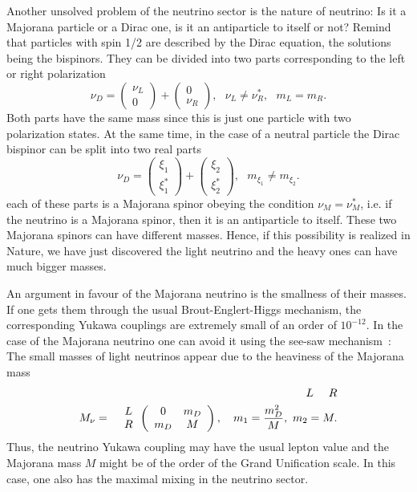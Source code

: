 \documentclass{cernyrep}
\begin{document}
Another unsolved problem of the neutrino sector is the nature of neutrino: Is it a Majorana particle or a Dirac one, is it an antiparticle  to itself or not?  Remind that  particles with spin 1/2  are described by the Dirac equation, the solutions being the bispinors. They can be divided into two parts corresponding to the left or right polarization
\begin{equation}
\nu_D=\left(\begin{array}{c} \nu_L \\ 0 \end{array}\right)+\left(\begin{array}{c} 0 \\ \nu_R \end{array}\right), \ \ \ \nu_L \neq \nu_R^*, \ \ \  m_L=m_R.
\end{equation}
Both parts have the same mass since this is just one particle with two polarization states. At the same time, in the case of a neutral particle the Dirac  bispinor can be split into two real parts  
\begin{equation}
\nu_D=\left(\begin{array}{c} \xi _1\\ \xi_1^* \end{array}\right)+ \left(\begin{array}{c} \xi_2 \\ \xi_2^* \end{array}\right), \ \ \  m_{\xi_1}\neq m_{\xi_2}.
\end{equation}
each of these parts is a Majorana spinor obeying the condition  $\nu_M=\nu_M^*$,
i.e. if the neutrino is a Majorana spinor, then it is an antiparticle to itself. These two Majorana spinors can have different masses. Hence, if this possibility is realized in Nature, we have just discovered the light neutrino and the heavy ones can have much bigger masses.

An argument in favour of the Majorana neutrino  is  the smallness of their masses. If one gets them through the usual Brout-Englert-Higgs mechanism, the corresponding Yukawa couplings are extremely small of an order of $10^{-12}$. In the case of the Majorana neutrino one can avoid it using the see-saw mechanism~\cite{seesaw}:  The small masses of light neutrinos appear due to the heaviness of the Majorana mass 
\begin{eqnarray}
&&\hspace{1.3cm} L \ \ \ \ R \nonumber\\
M_\nu&=&\begin{array}{c} L \\ R \end{array}\left( \begin{array}{cc} 0 & m_D \\ m_D & M \end{array}\right), \ \ \  m_1=\frac{m_D^2}{M}, \ m_2= M.
\end{eqnarray}
Thus, the neutrino Yukawa coupling  may have the usual lepton value and the Majorana mass  $M$ might be of the order of the Grand Unification scale. In this case, one also has the maximal mixing in the neutrino sector.
\end{document}
